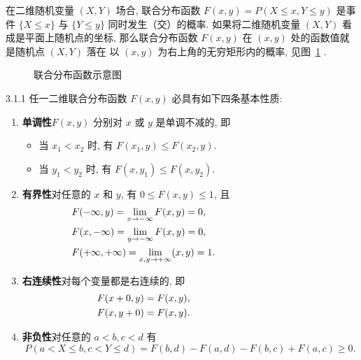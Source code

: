    在二维随机变量 $(X,Y)$ 场合, 联合分布函数 $F(x,y)=P(X\leq x,Y\leq y)$ 是事件 $\{X\leq x\}$ 与 $\{Y \leq y\}$ 同时发生（交）的概率.
   如果将二维随机变量 $(X,Y)$ 看成是平面上随机点的坐标, 那么联合分布函数 $F(x,y)$ 在 $(x,y)$ 处的函数值就是随机点 $(X, Y)$ 落在
   以 $(x,y)$ 为右上角的无穷矩形内的概率, 见图~\ref{fig:3.1.1} .
   \begin{figure}[htbp]
   	\centering
   	\caption{联合分布函数示意图}\label{fig:3.1.1}
   \end{figure}
   \begin{theorem}{}{3.1.1}
   	任一二维联合分布函数 $F(x,y)$ 必具有如下四条基本性质:
    \begin{enumerate}
    	\item \textbf{单调性}\quad $F(x,y)$ 分别对 $x$ 或 $y$ 是单调不减的, 即
    	\begin{itemize}
    		\item 当 $x_1<x_2$ 时, 有 $F(x_1,y)\leq F(x_2,y)$.
    		\item 当 $y_1<y_2$ 时, 有 $F(x,y_1)\leq F(x,y_2)$.
    	\end{itemize}
    	\item \textbf{有界性}\quad 对任意的 $x$ 和 $y$, 有 $0\leq F(x,y) \leq 1$, 且
    	\begin{align*}
    		&F(-\infty,y)=\lim_{x\to -\infty}F(x,y)=0,	&\hspace*{3cm} \\
    		&F(x,-\infty)=\lim_{y\to -\infty}F(x,y)=0,	&\\
    		&F(+\infty,+\infty)=\lim_{x,y\to +\infty}(x,y)=1.&
    	\end{align*}
    	\item \textbf{右连续性}\quad  对每个变量都是右连续的, 即
    		\begin{align*}
    			F(x+0, y) &=F(x, y), &\hspace*{3cm} \\
    			F(x, y+0) &=F(x, y). &
    		\end{align*}
    	\item \textbf{非负性}\quad 对任意的 $a<b,c<d$ 有
    		\begin{equation*}
    		 	P(a<X \leq b, c<Y \leq d)= F(b, d)-F(a, d)-F(b, c)+ F(a, c) \geq 0 .
    		\end{equation*}
    \end{enumerate}
   \end{theorem}
